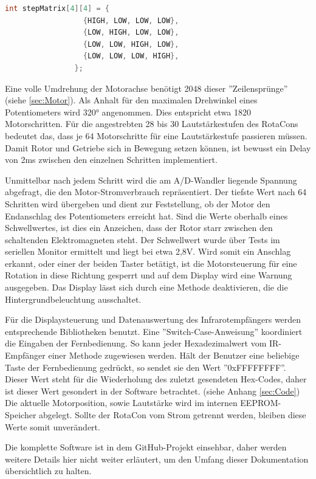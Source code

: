 \documentclass[11pt, titlepage]{report}
\begin{document}
			\begin{lstlisting}[gobble=28, language=C++]
				int stepMatrix[4][4] = {
  				  {HIGH, LOW, LOW, LOW},
  				  {LOW, HIGH, LOW, LOW},
  				  {LOW, LOW, HIGH, LOW},
  				  {LOW, LOW, LOW, HIGH},
				};
			\end{lstlisting}

			Eine volle Umdrehung der Motorachse benötigt 2048 dieser ''Zeilensprünge'' (siehe \ref{sec:Motor}). Als Anhalt für den maximalen Drehwinkel eines Potentiometers wird 320° angenommen. Dies entspricht etwa 1820 Motorschritten. Für die angestrebten 28 bis 30 Lautstärkestufen des RotaCons bedeutet das, dass je 64 Motorschritte für eine Lautstärkestufe passieren müssen. Damit Rotor und Getriebe sich in Bewegung setzen können, ist bewusst ein Delay von 2ms zwischen den einzelnen Schritten implementiert.

			Unmittelbar nach jedem Schritt wird die am A/D-Wandler liegende Spannung abgefragt, die den Motor-Stromverbrauch repräsentiert. Der tiefste Wert nach 64 Schritten wird übergeben und dient zur Feststellung, ob der Motor den Endanschlag des Potentiometers erreicht hat. Sind die Werte oberhalb eines Schwellwertes, ist dies ein Anzeichen, dass der Rotor starr zwischen den schaltenden Elektromagneten steht. Der Schwellwert wurde über Tests im seriellen Monitor ermittelt und liegt bei etwa 2,8V.\newline
			Wird somit ein Anschlag erkannt, oder einer der beiden Taster betätigt, ist die Motorsteuerung für eine Rotation in diese Richtung gesperrt und auf dem Display wird eine Warnung ausgegeben. Das Display lässt sich durch eine Methode deaktivieren, die die Hintergrundbeleuchtung ausschaltet.

			Für die Displaysteuerung und Datenauswertung des Infrarotempfängers werden entsprechende Bibliotheken benutzt. Eine ''Switch-Case-Anweisung'' koordiniert die Eingaben der Fernbedienung. So kann jeder Hexadezimalwert vom IR-Empfänger einer Methode zugewiesen werden. Hält der Benutzer eine beliebige Taste der Fernbedienung gedrückt, so sendet sie den Wert ''0xFFFFFFFF''. Dieser Wert steht für die Wiederholung des zuletzt gesendeten Hex-Codes, daher ist dieser Wert gesondert in der Software betrachtet. (siehe Anhang \ref{sec:Code}) 
			Die aktuelle Motorposition, sowie Lautstärke wird im internen EEPROM-Speicher abgelegt. Sollte der RotaCon vom Strom getrennt werden, bleiben diese Werte somit unverändert.
			
			Die komplette Software ist in dem GitHub-Projekt einsehbar, daher werden weitere Details hier nicht weiter erläutert, um den Umfang dieser Dokumentation übersichtlich zu halten.
		\newpage
\end{document}
